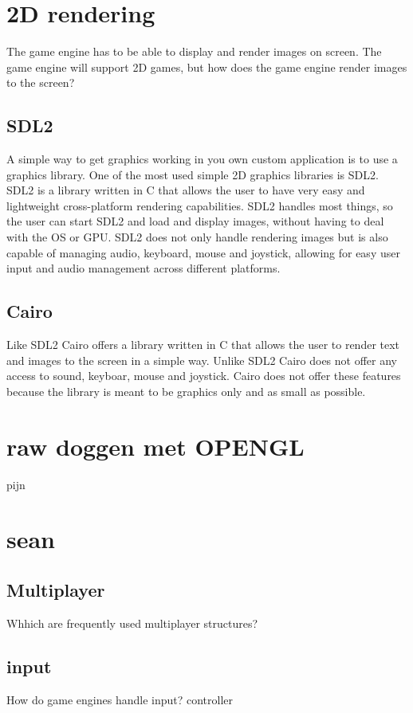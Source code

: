 \documentclass{article} %
\begin{document}
\newpage


\section{2D rendering}
The game engine has to be able to display and render images on screen.
The game engine will support 2D games, but how does the game engine render images to the screen?

\subsection{SDL2}
A simple way to get graphics working in you own custom application is to use a graphics library.
One of the most used simple 2D graphics libraries is SDL2.
SDL2 is a library written in C that allows the user to have very easy and lightweight cross-platform rendering capabilities.
SDL2 handles most things, so the user can start SDL2 and load and display images, without having to deal with the OS or GPU.
SDL2 does not only handle rendering images but is also capable of managing audio, keyboard, mouse and joystick, allowing for easy user input and audio management across different platforms.

\subsection{Cairo}
Like SDL2 Cairo offers a library written in C that allows the user to render text and images to the screen in a simple way.
Unlike SDL2 Cairo does not offer any access to sound, keyboar, mouse and joystick.
Cairo does not offer these features because the library is meant to be graphics only and as small as possible.

\section{raw doggen met OPENGL}
pijn
\newpage


\section{sean}
\subsection{Multiplayer}
Whhich are frequently used multiplayer structures?
\subsection{input}
How do game engines handle input?
controller
\end{document}
